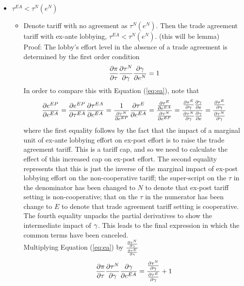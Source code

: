 \begin{itemize}					
	\item $\tau^{EA} < \tau^N(e^N)$
		\begin{itemize}
			\item Denote tariff with no agreement as $\tau^N(e^N)$. Then the trade agreement tariff with ex-ante lobbying, $\tau^{EA} < \tau^N(e^N)$. (this will be lemma) \\
			Proof: The lobby's effort level in the absence of a trade agreement is determined by the first order condition
				\begin{equation}
						\frac{\partial \pi}{\partial \tau} \frac{\partial \tau^N}{\partial \gamma} \frac{\partial \gamma}{\partial e^N} = 1
						\label{eq:nta}
				\end{equation}
			In order to compare this with Equation (\ref{eq:ea}), note that
			  \[
				  \frac{\partial e^{EP}}{\partial e^{EA}} = \frac{\partial e^{EP}}{\partial \tau^{EA}} \frac{\partial \tau^{EA}}{\partial e^{EA}} = \frac{1}{\frac{\partial \tau^N}{\partial e^{EP}}} \frac{\partial \tau^{E}}{\partial e^{EA}} =  \frac{\frac{\partial \tau^{E}}{\partial e^{EA}}}{\frac{\partial \tau^N}{\partial e^{EP}}} =  \frac{\frac{\partial \tau^{E}}{\partial \gamma}\frac{\partial \gamma}{\partial e}}{\frac{\partial \tau^N}{\partial \gamma}\frac{\partial \gamma}{\partial e}} =  \frac{\frac{\partial \tau^{E}}{\partial \gamma}}{\frac{\partial \tau^N}{\partial \gamma}} 
				\]
				where the first equality follows by the fact that the impact of a marginal unit of ex-ante lobbying effort on ex-post effort is to raise the trade agreement tariff. This is a tariff cap, and so we need to calculate the effect of this increased cap on ex-post effort. The second equality represents that this is just the inverse of the marginal impact of ex-post lobbying effort on the non-cooperative tariff; the super-script on the $\tau$ in the denominator has been changed to $N$ to denote that ex-post tariff setting is non-cooperative; that on the $\tau$ in the numerator has been change to $E$ to denote that trade agreement tariff setting is cooperative. The fourth equality unpacks the partial derivatives to show the intermediate impact of $\gamma$. This leads to the final expression in which the common terms have been canceled. \\
				Multiplying Equation (\ref{eq:ea}) by $\frac{\frac{\partial \tau^N}{\partial \gamma}}{\frac{\partial \tau^E}{\partial \gamma}}$
				  \begin{equation}
					  \frac{\partial \pi}{\partial \tau} \frac{\partial \tau^N}{\partial \ga} \frac{\partial \ga}{\partial e^{EA}} = \frac{\frac{\partial \tau^N}{\partial \ga}}{\frac{\partial \tau^E}{\partial \ga}} + 1

\end{equation}
\end{itemize}
\end{itemize}
